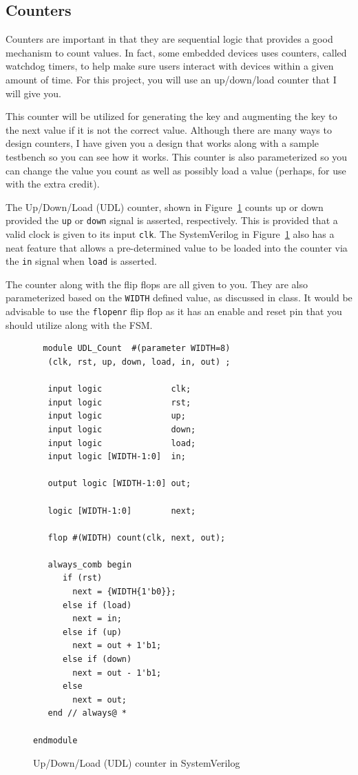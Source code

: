 \documentclass{article}
\begin{document}
\subsection{Counters}

Counters are important in that they are sequential logic that provides
a good mechanism to count values.  In fact, some embedded devices uses
counters, called watchdog timers, to help make sure users interact
with devices within a given amount of time.  For this project,  you
will use an up/down/load counter that I will give you.

This counter
will be utilized for generating the key and augmenting the key to the
next value if it is not the correct value.  Although there are many
ways to design counters, I have given you a design that works along
with a sample testbench so you can see how it works.
This counter is also parameterized so you can change the value you
count as well as possibly load a value (perhaps, for use with the
extra credit).

The Up/Down/Load (UDL) counter, shown in Figure~\ref{count.fig} counts
up or down provided the \verb!up! or \verb!down! signal is asserted, respectively.
This is provided that a valid clock is given to its input \verb!clk!.
The SystemVerilog in Figure~\ref{count.fig} also has a neat feature
that allows a pre-determined value to be loaded into the counter via
the \verb!in! signal when \verb!load! is asserted.

The counter along with the flip flops are all given to you.  They are
also parameterized based on the \verb!WIDTH! defined value, as
discussed in class.  It would be advisable to use the \verb!flopenr!
flip flop as it has an enable and reset pin that you should utilize
along with the FSM.
\begin{figure}
  \centering
  {\footnotesize
\begin{verbatim}
  module UDL_Count  #(parameter WIDTH=8) 
   (clk, rst, up, down, load, in, out) ;

   input logic              clk;
   input logic              rst;
   input logic              up;
   input logic              down;
   input logic              load;
   input logic [WIDTH-1:0]  in;
   
   output logic [WIDTH-1:0] out;

   logic [WIDTH-1:0]        next;
   
   flop #(WIDTH) count(clk, next, out);

   always_comb begin
      if (rst)
        next = {WIDTH{1'b0}};
      else if (load)
        next = in;
      else if (up)
        next = out + 1'b1;
      else if (down)
        next = out - 1'b1;
      else
        next = out;
   end // always@ *
   
endmodule 
\end{verbatim}
}
\caption{Up/Down/Load (UDL) counter in SystemVerilog}
\label{count.fig}
\end{figure}
\end{document}
